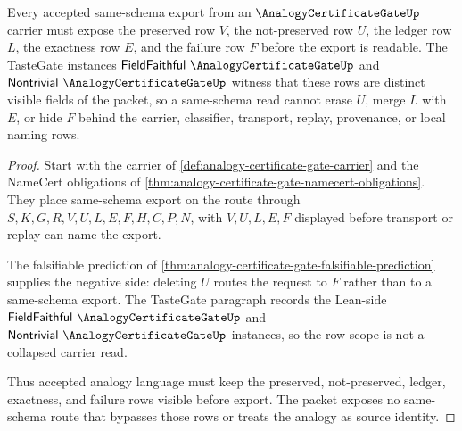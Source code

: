 \begin{theorem}
\label{thm:analogy-certificate-gate-obligation-row-scope}
Every accepted same-schema export from an $\AnalogyCertificateGateUp$ carrier must expose the preserved row $V$, the not-preserved row $U$, the ledger row $L$, the exactness row $E$, and the failure row $F$ before the export is readable. The TasteGate instances $\mathsf{FieldFaithful}\ \AnalogyCertificateGateUp$ and $\mathsf{Nontrivial}\ \AnalogyCertificateGateUp$ witness that these rows are distinct visible fields of the packet, so a same-schema read cannot erase $U$, merge $L$ with $E$, or hide $F$ behind the carrier, classifier, transport, replay, provenance, or local naming rows.
\end{theorem}
\begin{proof}
Start with the carrier of \autoref{def:analogy-certificate-gate-carrier} and the NameCert obligations of \autoref{thm:analogy-certificate-gate-namecert-obligations}. They place same-schema export on the route through $S,K,G,R,V,U,L,E,F,H,C,P,N$, with $V,U,L,E,F$ displayed before transport or replay can name the export.

The falsifiable prediction of \autoref{thm:analogy-certificate-gate-falsifiable-prediction} supplies the negative side: deleting $U$ routes the request to $F$ rather than to a same-schema export. The TasteGate paragraph records the Lean-side $\mathsf{FieldFaithful}\ \AnalogyCertificateGateUp$ and $\mathsf{Nontrivial}\ \AnalogyCertificateGateUp$ instances, so the row scope is not a collapsed carrier read.

Thus accepted analogy language must keep the preserved, not-preserved, ledger, exactness, and failure rows visible before export. The packet exposes no same-schema route that bypasses those rows or treats the analogy as source identity.
\end{proof}

